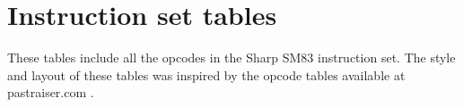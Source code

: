 
\chapter{Instruction set tables}

These tables include all the opcodes in the Sharp SM83 instruction set. The
style and layout of these tables was inspired by the opcode tables available at
pastraiser.com \cite{pastraiser}.

\begin{landscape}

\newcommand{\oplb}{\cellcolor{SkyBlue}}
\newcommand{\oplw}{\cellcolor{PaleGreen}}
\newcommand{\opab}{\cellcolor{Gold}}
\newcommand{\opaw}{\cellcolor{Pink}}
\newcommand{\opbi}{\cellcolor{Turquoise}}
\newcommand{\opcf}{\cellcolor{SandyBrown}}
\newcommand{\opmi}{\cellcolor{PaleVioletRed}}
\newcommand{\opun}{\cellcolor{Silver}}


\end{landscape}
